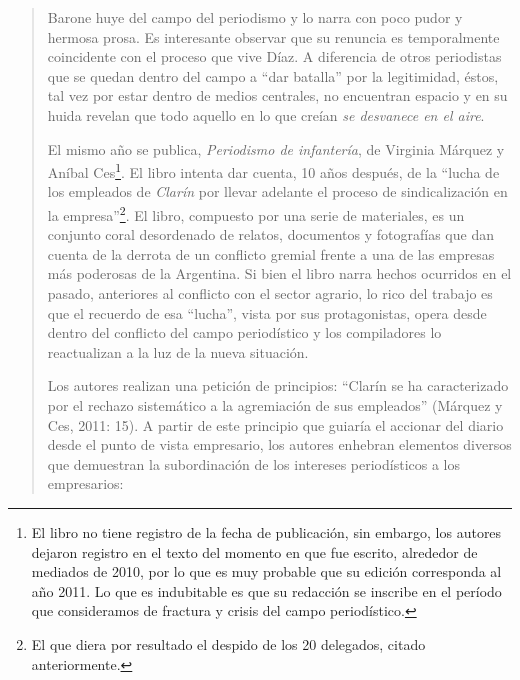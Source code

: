 \begin{quote}
Barone huye del campo del periodismo y lo narra con poco pudor y hermosa prosa. Es interesante observar que su renuncia es temporalmente coincidente con el proceso que vive Díaz. A diferencia de otros periodistas que se quedan dentro del campo a ``dar batalla'' por la legitimidad, éstos, tal vez por estar dentro de medios centrales, no encuentran espacio y en su huida revelan que todo aquello en lo que creían \emph{se desvanece en el aire}.

El mismo año se publica, \emph{Periodismo de infantería}, de Virginia Márquez y Aníbal Ces\footnote{El libro no tiene registro de la fecha de publicación, sin embargo, los autores dejaron registro en el texto del momento en que fue escrito, alrededor de mediados de 2010, por lo que es muy probable que su edición corresponda al año 2011. Lo que es indubitable es que su redacción se inscribe en el período que consideramos de fractura y crisis del campo periodístico.}. El libro intenta dar cuenta, 10 años después, de la ``lucha de los empleados de \emph{Clarín} por llevar adelante el proceso de sindicalización en la empresa''\footnote{El que diera por resultado el despido de los 20 delegados, citado anteriormente.}. El libro, compuesto por una serie de materiales, es un conjunto coral desordenado de relatos, documentos y fotografías que dan cuenta de la derrota de un conflicto gremial frente a una de las empresas más poderosas de la Argentina. Si bien el libro narra hechos ocurridos en el pasado, anteriores al conflicto con el sector agrario, lo rico del trabajo es que el recuerdo de esa ``lucha'', vista por sus protagonistas, opera desde dentro del conflicto del campo periodístico y los compiladores lo reactualizan a la luz de la nueva situación.

Los autores realizan una petición de principios: \enquote{Clarín se ha caracterizado por el rechazo sistemático a la agremiación de sus empleados} (Márquez y Ces, 2011: 15). A partir de este principio que guiaría el accionar del diario desde el punto de vista empresario, los autores enhebran elementos diversos que demuestran la subordinación de los intereses periodísticos a los empresarios:


\end{quote}
